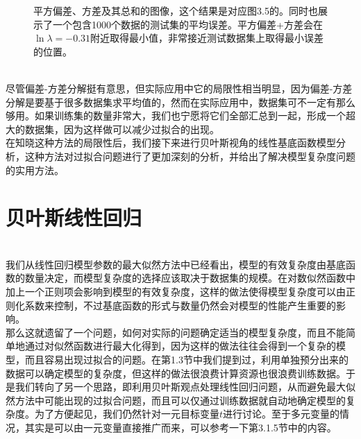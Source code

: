 \documentclass[b5paper]{book}
\numberwithin{equation}{chapter}
\newcommand {\insertline} {\noindent{\color{red} \rule[5pt]{\textwidth}{0.1em}}}
\begin{document}
{\begin{figure}[ht]
		\caption{平方偏差、方差及其总和的图像，这个结果是对应图3.5的。同时也展示了一个包含1000个数据的测试集的平均误差。平方偏差+方差会在$\ln \lambda = -0.31$附近取得最小值，非常接近测试数据集上取得最小误差的位置。}
		\label{fig:3-6}
	\end{figure}
	\\
	\indent 尽管偏差-方差分解挺有意思，但实际应用中它的局限性相当明显，因为偏差-方差分解是要基于很多数据集求平均值的，然而在实际应用中，数据集可不一定有那么够用。如果训练集的数量非常大，我们也宁愿将它们全部汇总到一起，形成一个超大的数据集，因为这样做可以减少过拟合的出现。\\
	\indent 在知晓这种方法的局限性后，我们接下来进行贝叶斯视角的线性基底函数模型分析，这种方法对过拟合问题进行了更加深刻的分析，并给出了解决模型复杂度问题的实用方法。
	}
	\section{贝叶斯线性回归}
	\insertline \\
	\textnormal{
	\indent 我们从线性回归模型参数的最大似然方法中已经看出，模型的有效复杂度由基底函数的数量决定，而模型复杂度的选择应该取决于数据集的规模。在对数似然函数中加上一个正则项会影响到模型的有效复杂度，这样的做法使得模型复杂度可以由正则化系数来控制，不过基底函数的形式与数量仍然会对模型的性能产生重要的影响。\\
	\indent 那么这就遗留了一个问题，如何对实际的问题确定适当的模型复杂度，而且不能简单地通过对似然函数进行最大化得到，因为这样的做法往往会得到一个复杂的模型，而且容易出现过拟合的问题。在第1.3节中我们提到过，利用单独预分出来的数据可以确定模型的复杂度，但这样的做法很浪费计算资源也很浪费训练数据。于是我们转向了另一个思路，即利用贝叶斯观点处理线性回归问题，从而避免最大似然方法中可能出现的过拟合问题，而且可以仅通过训练数据就自动地确定模型的复杂度。为了方便起见，我们仍然针对一元目标变量$t$进行讨论。至于多元变量的情况，其实是可以由一元变量直接推广而来，可以参考一下第3.1.5节中的内容。
	}
\end{document}
